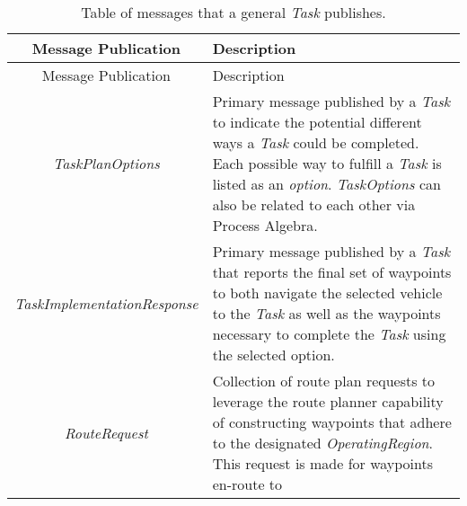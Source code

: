 \begin{longtable}[]{@{}cl@{}}
\caption{Table of messages that a general \emph{Task}
publishes.}\tabularnewline
\toprule
\begin{minipage}[b]{0.40\columnwidth}\centering\strut
Message Publication\strut
\end{minipage} & \begin{minipage}[b]{0.55\columnwidth}\raggedright\strut
Description\strut
\end{minipage}\tabularnewline
\midrule
\endfirsthead
\toprule
\begin{minipage}[b]{0.40\columnwidth}\centering\strut
Message Publication\strut
\end{minipage} & \begin{minipage}[b]{0.55\columnwidth}\raggedright\strut
Description\strut
\end{minipage}\tabularnewline
\midrule
\endhead
\begin{minipage}[t]{0.40\columnwidth}\centering\strut
\emph{TaskPlanOptions}\strut
\end{minipage} & \begin{minipage}[t]{0.55\columnwidth}\raggedright\strut
Primary message published by a \emph{Task} to indicate the potential
different ways a \emph{Task} could be completed. Each possible way to
fulfill a \emph{Task} is listed as an \emph{option}. \emph{TaskOptions}
can also be related to each other via Process Algebra.\strut
\end{minipage}\tabularnewline
\begin{minipage}[t]{0.40\columnwidth}\centering\strut
\emph{TaskImplementationResponse}\strut
\end{minipage} & \begin{minipage}[t]{0.55\columnwidth}\raggedright\strut
Primary message published by a \emph{Task} that reports the final set of
waypoints to both navigate the selected vehicle to the \emph{Task} as
well as the waypoints necessary to complete the \emph{Task} using the
selected option.\strut
\end{minipage}\tabularnewline
\begin{minipage}[t]{0.40\columnwidth}\centering\strut
\emph{RouteRequest}\strut
\end{minipage} & \begin{minipage}[t]{0.55\columnwidth}\raggedright\strut
Collection of route plan requests to leverage the route planner
capability of constructing waypoints that adhere to the designated
\emph{OperatingRegion}. This request is made for waypoints en-route to

\end{minipage}
\end{longtable}

